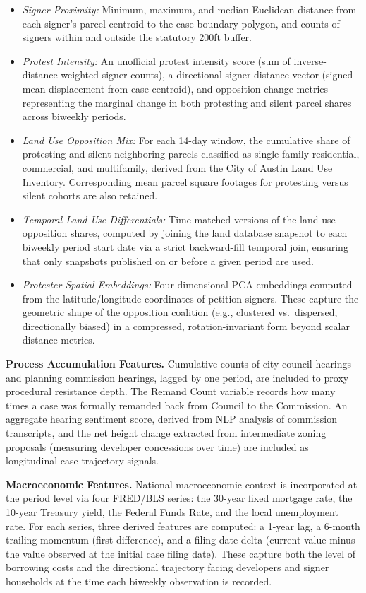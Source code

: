 \documentclass[twoside,11pt]{article}
\begin{document}
\begin{itemize}
    \item \textit{Signer Proximity:} Minimum, maximum, and median Euclidean distance from each signer's parcel centroid to the case boundary polygon, and counts of signers within and outside the statutory 200ft buffer.
    \item \textit{Protest Intensity:} An unofficial protest intensity score (sum of inverse-distance-weighted signer counts), a directional signer distance vector (signed mean displacement from case centroid), and opposition change metrics representing the marginal change in both protesting and silent parcel shares across biweekly periods.
    \item \textit{Land Use Opposition Mix:} For each 14-day window, the cumulative share of protesting and silent neighboring parcels classified as single-family residential, commercial, and multifamily, derived from the City of Austin Land Use Inventory. Corresponding mean parcel square footages for protesting versus silent cohorts are also retained.
    \item \textit{Temporal Land-Use Differentials:} Time-matched versions of the land-use opposition shares, computed by joining the land database snapshot to each biweekly period start date via a strict backward-fill temporal join, ensuring that only snapshots published on or before a given period are used.
    \item \textit{Protester Spatial Embeddings:} Four-dimensional PCA embeddings computed from the latitude/longitude coordinates of petition signers. These capture the geometric shape of the opposition coalition (e.g., clustered vs.\ dispersed, directionally biased) in a compressed, rotation-invariant form beyond scalar distance metrics.
\end{itemize}

\textbf{Process Accumulation Features.} Cumulative counts of city council hearings and planning commission hearings, lagged by one period, are included to proxy procedural resistance depth. The Remand Count variable records how many times a case was formally remanded back from Council to the Commission. An aggregate hearing sentiment score, derived from NLP analysis of commission transcripts, and the net height change extracted from intermediate zoning proposals (measuring developer concessions over time) are included as longitudinal case-trajectory signals.

\textbf{Macroeconomic Features.} National macroeconomic context is incorporated at the period level via four FRED/BLS series: the 30-year fixed mortgage rate, the 10-year Treasury yield, the Federal Funds Rate, and the local unemployment rate. For each series, three derived features are computed: a 1-year lag, a 6-month trailing momentum (first difference), and a filing-date delta (current value minus the value observed at the initial case filing date). These capture both the level of borrowing costs and the directional trajectory facing developers and signer households at the time each biweekly observation is recorded.
\end{document}
